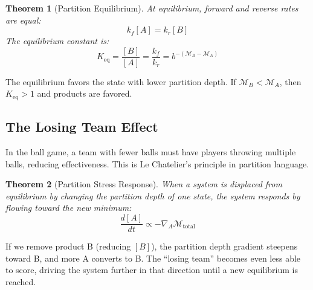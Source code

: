 ﻿\documentclass[twocolumn,10pt,a4paper]{article}
\newtheorem{theorem}{Theorem}[section]
\theoremstyle{definition}
\theoremstyle{remark}
\newcommand{\Depth}{\mathcal{M}}
\begin{document}
\begin{theorem}[Partition Equilibrium]
\label{thm:equilibrium}
At equilibrium, forward and reverse rates are equal:
\begin{equation}
    k_f [A] = k_r [B]
\end{equation}
The equilibrium constant is:
\begin{equation}
    K_{\mathrm{eq}} = \frac{[B]}{[A]} = \frac{k_f}{k_r} = b^{-(\Depth_B - \Depth_A)}
\end{equation}
\end{theorem}

The equilibrium favors the state with lower partition depth. If $\Depth_B < \Depth_A$, then $K_{\mathrm{eq}} > 1$ and products are favored.

\subsection{The Losing Team Effect}

In the ball game, a team with fewer balls must have players throwing multiple balls, reducing effectiveness. This is Le Chatelier's principle in partition language.

\begin{theorem}[Partition Stress Response]
\label{thm:lechatelier}
When a system is displaced from equilibrium by changing the partition depth of one state, the system responds by flowing toward the new minimum:
\begin{equation}
    \frac{d[A]}{dt} \propto -\nabla_A \Depth_{\mathrm{total}}
\end{equation}
\end{theorem}

If we remove product B (reducing $[B]$), the partition depth gradient steepens toward B, and more A converts to B. The ``losing team'' becomes even less able to score, driving the system further in that direction until a new equilibrium is reached.
\end{document}
